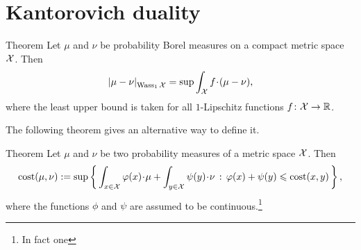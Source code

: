 \section{Kantorovich duality}


\begin{thm}{Theorem}
Let $\mu$ and $\nu$ be probability Borel measures on a compact metric space $\mathcal{X}$.
Then
\[\dist{\mu}{\nu}{\Wass_1\spc{X}}=\sup\int_{\spc{X}} f\cdot(\mu-\nu),\]
where the least upper bound is taken for all $1$-Lipschitz functions $f\:\spc{X}\z\to\RR$.
\end{thm}


The following theorem gives an alternative way to define it.

\begin{thm}{Theorem}
Let $\mu$ and $\nu$ be two probability measures of a metric space $\mathcal{X}$.
Then 
\[\cost(\mu,\nu)
\df
\sup\set{\int_{x\in\spc{X}}\phi(x)\cdot\mu+\int_{y\in\spc{X}}\psi(y)\cdot\nu}{\phi(x)+\psi(y)\le \cost(x,y)},\]
where the functions $\phi$ and $\psi$ are assumed to be continuous.\footnote{In fact one }
\end{thm}





